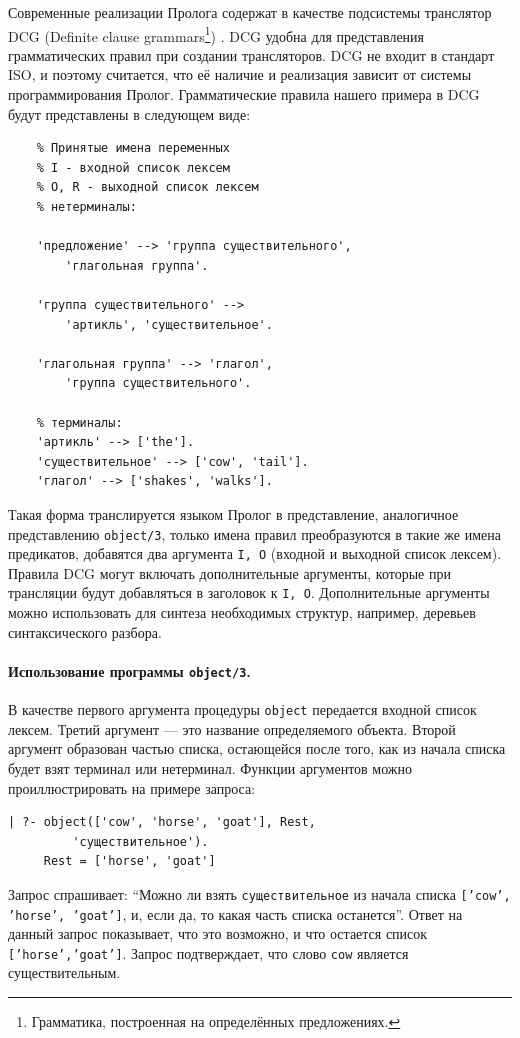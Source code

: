 \documentclass[12pt, openany, twoside]{book} %
\begin{document}
Современные реализации Пролога содержат в качестве подсистемы транслятор DCG (Definite clause grammars\footnote{Грамматика, построенная на определённых предложениях.}) \cite{WIKI-DCG}.  DCG удобна для представления грамматических правил при создании трансляторов. DCG не входит в стандарт ISO, и поэтому считается, что её наличие и реализация зависит от системы программирования Пролог. Грамматические правила нашего примера в DCG будут представлены в следующем виде:
{\tt\begin{verbatim}
    % Принятые имена переменных
    % I - входной список лексем
    % О, R - выходной список лексем
    % нетерминалы:

    'предложение' --> 'группа существительного',
        'глагольная группа'.

    'группа существительного' -->
        'артикль', 'существительное'.

    'глагольная группа' --> 'глагол',
        'группа существительного'.

    % терминалы:
    'артикль' --> ['the'].
    'существительное' --> ['cow', 'tail'].
    'глагол' --> ['shakes', 'walks'].
\end{verbatim}}
\noindent{} Такая форма транслируется языком Пролог в представление, аналогичное представлению \texttt{object/3}, только имена правил преобразуются в такие же имена предикатов, добавятся два аргумента \texttt{I, O} (входной и выходной список лексем). Правила DCG могут включать дополнительные аргументы, которые при трансляции будут добавляться в заголовок к \texttt{I, O}. Дополнительные аргументы можно использовать для синтеза необходимых структур, например, деревьев синтаксического разбора.

\paragraph{Использование программы {\tt object/3}.} В качестве первого аргумента процедуры {\tt object} передается входной список лексем. Третий аргумент --- это название определяемого объекта. Второй аргумент образован частью списка, остающейся после того, как из начала списка будет взят терминал или нетерминал. Функции аргументов можно проиллюстрировать на примере запроса:

{\tt\begin{verbatim}
| ?- object(['cow', 'horse', 'goat'], Rest,
         'существительное').
     Rest = ['horse', 'goat']
\end{verbatim}}

Запрос спрашивает: ``Можно ли взять {\tt существительное} из начала списка {\tt ['cow', 'horse', 'goat']}, и, если да, то какая часть списка останется''. Ответ на данный запрос показывает, что это возможно, и что остается список {\tt ['horse','goat']}. Запрос подтверждает, что слово {\tt cow} является существительным.
\end{document}

